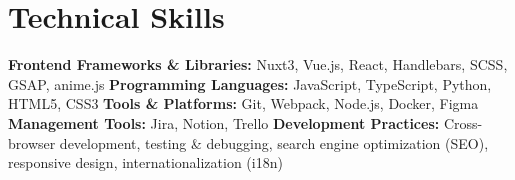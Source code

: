 \section*{Technical Skills}
%
%
%
\begin{tasks}
  \task \textbf{Frontend Frameworks \& Libraries:} Nuxt3, Vue.js, React, Handlebars, SCSS, GSAP, anime.js
  \task \textbf{Programming Languages:} JavaScript, TypeScript, Python, HTML5, CSS3
  \task \textbf{Tools \& Platforms:} Git, Webpack, Node.js, Docker, Figma
  \task \textbf{Management Tools:} Jira, Notion, Trello
  \task \textbf{Development Practices:} Cross-browser development, testing \& debugging, search engine optimization (SEO), responsive design, internationalization (i18n)
\end{tasks}
